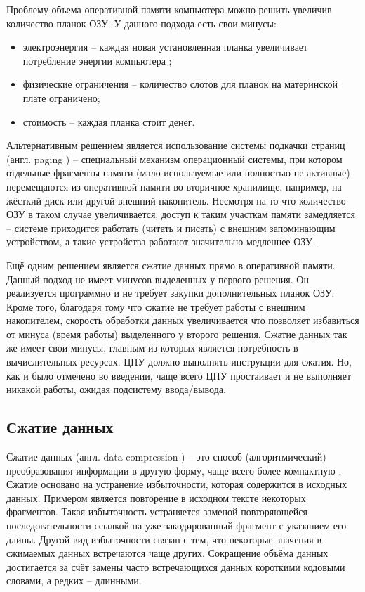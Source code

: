 Проблему объема оперативной памяти компьютера можно решить увеличив количество планок ОЗУ. У данного подхода есть свои минусы:

\begin{itemize}
	\item электроэнергия -- каждая новая установленная планка увеличивает потребление энергии компьютера \cite{increasing-ram-bad};
	\item физические ограничения -- количество слотов для планок на материнской плате ограничено;
	\item стоимость -- каждая планка стоит денег.
\end{itemize}

Альтернативным решением является использование системы подкачки страниц (англ. paging \cite{paging}) -- специальный механизм операционный системы, при котором отдельные фрагменты памяти (мало используемые или полностью не активные) перемещаются из оперативной памяти во вторичное хранилище, например, на жёсткий диск или другой внешний накопитель. Несмотря на то что количество ОЗУ в таком случае увеличивается, доступ к таким участкам памяти замедляется -- системе приходится работать (читать и писать) с внешним запоминающим устройством, а такие устройства работают значительно медленнее ОЗУ \cite{ssd-hdd-speed}.

Ещё одним решением является сжатие данных прямо в оперативной памяти. Данный подход не имеет минусов выделенных у первого решения. Он реализуется программно и не требует закупки дополнительных планок ОЗУ. Кроме того, благодаря тому что сжатие не требует работы с внешним накопителем, скорость обработки данных увеличивается что позволяет избавиться от минуса (время работы) выделенного у второго решения. Сжатие данных так же имеет свои минусы, главным из которых является потребность в вычислительных ресурсах. ЦПУ должно выполнять инструкции для сжатия. Но, как и было отмечено во введении, чаще всего ЦПУ простаивает и не выполняет никакой работы, ожидая подсистему ввода/вывода.

\subsection{Сжатие данных}

Сжатие данных (англ. data compression \cite{data-compression-encyclopedia}) --  это способ (алгоритмический) преобразования информации в другую форму, чаще всего более компактную \cite{data-compression}. Сжатие основано на устранение избыточности, которая содержится в исходных данных. Примером является повторение в исходном тексте некоторых фрагментов. Такая избыточность устраняется заменой повторяющейся последовательности ссылкой на уже закодированный фрагмент с указанием его длины. Другой вид избыточности связан с тем, что некоторые значения в сжимаемых данных встречаются чаще других. Сокращение объёма данных достигается за счёт замены часто встречающихся данных короткими кодовыми словами, а редких -- длинными.

